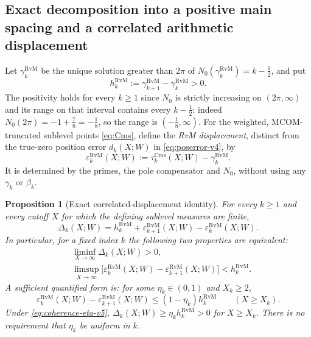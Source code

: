 \documentclass[11pt,a4paper]{article}
\numberwithin{equation}{section}
\newtheorem{proposition}[theorem]{Proposition}
\theoremstyle{definition}
\theoremstyle{remark}
\newcommand{\Cms}{\mathrm{Cms}}
\begin{document}
\subsection{Exact decomposition into a positive main spacing and a
           correlated arithmetic displacement}
Let $\gamma_k^{\mathrm{RvM}}$ be the unique solution greater than $2\pi$ of
$N_0(\gamma_k^{\mathrm{RvM}})=k-\tfrac12$, and put
\begin{equation}\label{eq:hrvm-v5}
 h_k^{\mathrm{RvM}}:=\gamma_{k+1}^{\mathrm{RvM}}-
 \gamma_k^{\mathrm{RvM}}>0.
\end{equation}
The positivity holds for every $k\ge1$ since $N_0$ is strictly
increasing on $(2\pi,\infty)$ and its range on that interval contains
every $k-\tfrac12$: indeed $N_0(2\pi)=-1+\frac78=-\frac18$, so the
range is $(-\frac18,\infty)$.  For the weighted, MCOM-truncated sublevel points
\eqref{eq:Cms}, define the \emph{RvM displacement}, distinct from the
true-zero position error $d_k(X;W)$ in \eqref{eq:poserror-v4}, by
\begin{equation}\label{eq:epsrvm-v5}
 \varepsilon_k^{\mathrm{RvM}}(X;W):=
 \tau_k^{\Cms}(X;W)-\gamma_k^{\mathrm{RvM}}.
\end{equation}
It is determined by the primes, the pole compensator and $N_0$,
without using any $\gamma_k$ or $\beta_k$.
\begin{proposition}[Exact correlated-displacement identity]
\label{prop:correlated-v5}
For every $k\ge1$ and every cutoff $X$ for which the defining
sublevel measures are finite,
\begin{equation}\label{eq:correlated-v5}
\boxed{\quad
 \Delta_k(X;W)=h_k^{\mathrm{RvM}}
 +\varepsilon_{k+1}^{\mathrm{RvM}}(X;W)
 -\varepsilon_k^{\mathrm{RvM}}(X;W).
\quad}
\end{equation}
In particular, for a fixed index $k$ the following two properties are
equivalent:
\begin{align}
 &\liminf_{X\to\infty}\Delta_k(X;W)>0,
 \label{eq:noncollapse-v5}\\
 &\limsup_{X\to\infty}
 \bigl[\varepsilon_k^{\mathrm{RvM}}(X;W)-
       \varepsilon_{k+1}^{\mathrm{RvM}}(X;W)\bigr]
 <h_k^{\mathrm{RvM}}.
 \label{eq:coherence-v5}
\end{align}
A sufficient quantified form is: for some $\eta_k\in(0,1)$ and
$X_k\ge2$,
\begin{equation}\label{eq:coherence-eta-v5}
 \varepsilon_k^{\mathrm{RvM}}(X;W)-
 \varepsilon_{k+1}^{\mathrm{RvM}}(X;W)
 \le(1-\eta_k)h_k^{\mathrm{RvM}}
 \qquad(X\ge X_k).
\end{equation}
Under \eqref{eq:coherence-eta-v5},
$\Delta_k(X;W)\ge\eta_k h_k^{\mathrm{RvM}}>0$ for $X\ge X_k$.
There is no requirement that $\eta_k$ be uniform in $k$.
\end{proposition}
\end{document}

